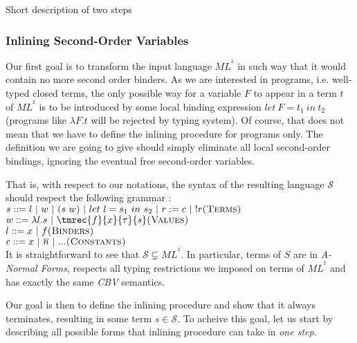 \documentclass[a4paper,11pt,oneside]{article}
\theoremstyle{plain}
\newcommand{\tmlet}[3]{let~#1=#2~in~#3}
\newcommand{\inlS}{\mathcal{S}}
\newcommand{\inlsrc}{\textit{ML}^{^2}}
\newcommand{\inlT}{\inlsrc}
\begin{document}
Short description of two steps 
\subsubsection*{Inlining Second-Order Variables}

Our first goal is to transform the input language $\inlT$ in such way that it
would contain no more second order binders. As we are interested in programs, 
i.e. well-typed closed terms, the only possible way for a variable $F$ to 
appear in a term $t$ of $\inlT$ is to be introduced by some local binding 
expression $\tmlet{F}{t_1}{t_2}$ (programs like $\lambda F. t$ will be
rejected by typing system). Of course, that does not mean that we have to define 
the inlining procedure for programs only. The definition we are going to give
should simply eliminate all local second-order bindings, ignoring the eventual
free second-order variables.

That is, with respect to our notations, the syntax of the resulting language
 $\inlS$ should respect the following grammar :\\[1em]\indent 
  $ s ::= l~|~w~|~(s~w) ~|~ \tmlet{l}{s_1}{s_2} ~|~ r:= c ~|~ !r \hfill \textsc{(Terms)}$ \\\indent 
  $ w ::= \lambda l. s ~|~ \tmrec{f}{x}{\tau}{s}\hfill \textsc{(Values)}$ \\\indent 
  $ l ::= x ~|~ f \hfill \textsc{(Binders)}$ \\\indent 
  $ c ::= x ~|~ \overline{n}~|~... \hfill \textsc{(Constants)}$\\[1em]

It is straightforward to see that $\inlS \subsetneq \inlT$. In particular,
terms of $S$ are in \textit{A-Normal Forms}, respects all typing restrictions 
we imposed on terms of $\inlT$ and has exactly the same \textit{CBV} semantics. 

Our goal is then to define the inlining procedure and show that it always
terminates, resulting in some term $s \in \inlS$.
To acheive this goal, let us start by describing all possible forms that
inlining procedure can take in \textit{one step}.
\end{document}
